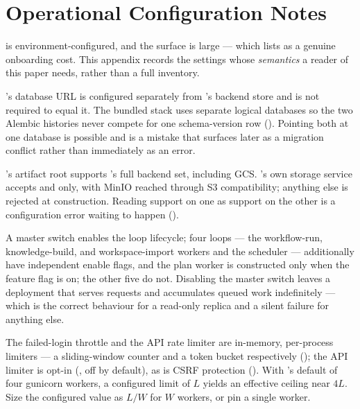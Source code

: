 \section{Operational Configuration Notes}
\label{app:config}

\sys is environment-configured, and the surface is large --- which
 lists as a genuine onboarding cost. This appendix records the
settings whose \emph{semantics} a reader of this paper needs, rather than a full
inventory.

 \sys's database URL is
configured separately from \mlflow{}'s backend store and is not required to equal
it. The bundled stack uses separate logical databases so the two Alembic histories
never compete for one schema-version row (). Pointing both at one
database is possible and is a mistake that surfaces later as a migration conflict
rather than immediately as an error.

 \mlflow{}'s artifact root
supports \mlflow{}'s full backend set, including GCS. \sys's own storage service
accepts  and  only, with MinIO reached through S3
compatibility; anything else is rejected at construction. Reading support on one as
support on the other is a configuration error waiting to happen
().

 A master switch enables the loop
lifecycle; four loops --- the workflow-run, knowledge-build, and workspace-import
workers and the scheduler --- additionally have independent enable flags, and the
\aria{} plan worker is constructed only when the \aria{} feature flag is on; the
other five do not.
Disabling the master switch leaves a deployment that serves requests and accumulates
queued work indefinitely --- which is the correct behaviour for a read-only replica
and a silent failure for anything else.

 The failed-login throttle and the API rate limiter
are in-memory, per-process limiters --- a sliding-window counter and a token bucket
respectively (); the API limiter is opt-in
(, off by default), as is CSRF protection
(). With \mlflow{}'s default of four
gunicorn workers, a configured limit of $L$ yields an effective ceiling near $4L$.
Size the configured value as $L/W$ for $W$ workers, or pin a single worker.

